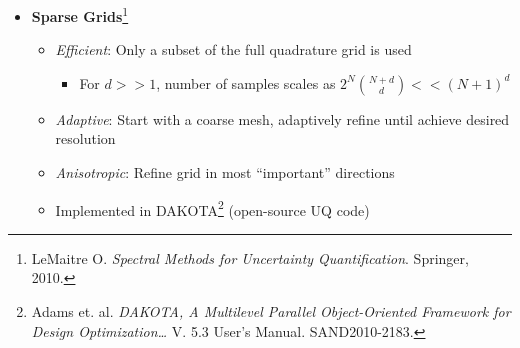 \documentclass[9pt]{beamer}
\begin{document}
\begin{frame}
\begin{itemize}
\item \textbf{Sparse Grids}\footnote{LeMaitre O. \emph{Spectral Methods for Uncertainty Quantification}. Springer, 2010.
 }
\begin{itemize}
\item \emph{Efficient}: Only a subset of the full quadrature grid is used
\begin{itemize}
\item For $d >> 1$, number of samples scales as $2^N {N+d \choose d} <<
      (N+1)^d$
\end{itemize}
\item \emph{Adaptive}: Start with a coarse mesh, adaptively refine until
    achieve desired resolution
\item \emph{Anisotropic}: Refine grid in most ``important'' directions
\item Implemented in DAKOTA\footnote{Adams et. al. \emph{DAKOTA, A Multilevel Parallel Object-Oriented Framework for Design Optimization\ldots{}} V. 5.3 User's
Manual. SAND2010-2183.
 } (open-source UQ code)
\end{itemize}
\end{itemize}
\end{frame}
\end{document}
